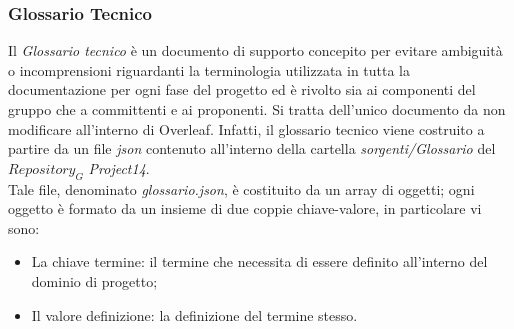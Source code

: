 \subsubsection{Glossario Tecnico}
Il \emph{Glossario tecnico} è un documento di supporto concepito per evitare ambiguità o incomprensioni riguardanti la terminologia utilizzata in tutta la documentazione per ogni fase del progetto ed è rivolto sia ai componenti del gruppo che a committenti e ai proponenti.
Si tratta dell'unico documento da non modificare all'interno di Overleaf. Infatti, il glossario tecnico viene costruito a partire da un file \emph{json} contenuto all'interno della cartella \emph{sorgenti/Glossario} del $\textit{Repository}_G$ \emph{Project14}.\\
Tale file, denominato \emph{glossario.json}, è costituito da un array di oggetti; ogni oggetto è formato da un insieme di due coppie chiave-valore, in particolare vi sono:
\begin{itemize}
    \item La chiave termine: il termine che necessita di essere definito all'interno del dominio di progetto;
    \item Il valore definizione: la definizione del termine stesso.
\end{itemize}

